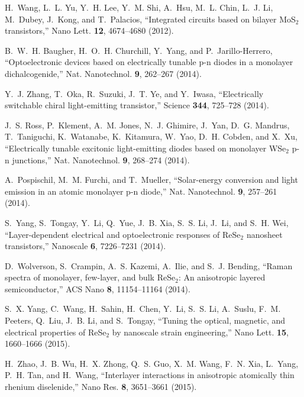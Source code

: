 \documentclass{osa-article}
\begin{document}
\begin{thebibliography}{1}
H.~Wang, L.~L. Yu, Y.~H. Lee, Y.~M. Shi, A.~Hsu, M.~L. Chin, L.~J. Li,
  M.~Dubey, J.~Kong, and T.~Palacios, \enquote{Integrated circuits based on
  bilayer {MoS$_2$} transistors,} Nano Lett. \textbf{12}, 4674--4680 (2012).

B.~W.~H. Baugher, H.~O.~H. Churchill, Y.~Yang, and P.~Jarillo-Herrero,
  \enquote{Optoelectronic devices based on electrically tunable p-n diodes in a
  monolayer dichalcogenide,} Nat. Nanotechnol. \textbf{9}, 262--267 (2014).

Y.~J. Zhang, T.~Oka, R.~Suzuki, J.~T. Ye, and Y.~Iwasa, \enquote{Electrically
  switchable chiral light-emitting transistor,} Science \textbf{344}, 725--728
  (2014).

J.~S. Ross, P.~Klement, A.~M. Jones, N.~J. Ghimire, J.~Yan, D.~G. Mandrus,
  T.~Taniguchi, K.~Watanabe, K.~Kitamura, W.~Yao, D.~H. Cobden, and X.~Xu,
  \enquote{Electrically tunable excitonic light-emitting diodes based on
  monolayer {WSe$_2$} p-n junctions,} Nat. Nanotechnol. \textbf{9}, 268--274
  (2014).

A.~Pospischil, M.~M. Furchi, and T.~Mueller, \enquote{Solar-energy conversion
  and light emission in an atomic monolayer p-n diode,} Nat. Nanotechnol.
  \textbf{9}, 257--261 (2014).

S.~Yang, S.~Tongay, Y.~Li, Q.~Yue, J.~B. Xia, S.~S. Li, J.~Li, and S.~H. Wei,
  \enquote{Layer-dependent electrical and optoelectronic responses of
  {ReSe$_2$} nanosheet transistors,} Nanoscale \textbf{6}, 7226--7231 (2014).

D.~Wolverson, S.~Crampin, A.~S. Kazemi, A.~Ilie, and S.~J. Bending,
  \enquote{Raman spectra of monolayer, few-layer, and bulk {ReSe$_2$}: An
  anisotropic layered semiconductor,} ACS Nano \textbf{8}, 11154--11164 (2014).

S.~X. Yang, C.~Wang, H.~Sahin, H.~Chen, Y.~Li, S.~S. Li, A.~Suslu, F.~M.
  Peeters, Q.~Liu, J.~B. Li, and S.~Tongay, \enquote{Tuning the optical,
  magnetic, and electrical properties of {ReSe$_2$} by nanoscale strain
  engineering,} Nano Lett. \textbf{15}, 1660--1666 (2015).

H.~Zhao, J.~B. Wu, H.~X. Zhong, Q.~S. Guo, X.~M. Wang, F.~N. Xia, L.~Yang,
  P.~H. Tan, and H.~Wang, \enquote{Interlayer interactions in anisotropic
  atomically thin rhenium diselenide,} Nano Res. \textbf{8}, 3651--3661 (2015).


\end{thebibliography}
\end{document}
